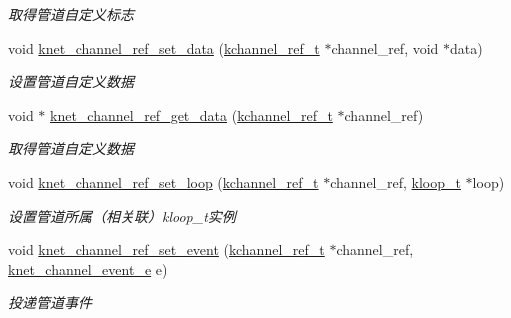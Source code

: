 \begin{DoxyCompactItemize}
\begin{DoxyCompactList}\small\item\em 取得管道自定义标志 \end{DoxyCompactList}\item 
void \hyperlink{a00049_a9c7f39305266c9bf15cd40b8cdf6013e_a9c7f39305266c9bf15cd40b8cdf6013e}{knet\+\_\+channel\+\_\+ref\+\_\+set\+\_\+data} (\hyperlink{a00051_a3b7e82599367eade261456f60ebe2cd9_a3b7e82599367eade261456f60ebe2cd9}{kchannel\+\_\+ref\+\_\+t} $\ast$channel\+\_\+ref, void $\ast$data)
\begin{DoxyCompactList}\small\item\em 设置管道自定义数据 \end{DoxyCompactList}\item 
void $\ast$ \hyperlink{a00049_a16cd64ed0ec7f68931aea3abd3bf1e24_a16cd64ed0ec7f68931aea3abd3bf1e24}{knet\+\_\+channel\+\_\+ref\+\_\+get\+\_\+data} (\hyperlink{a00051_a3b7e82599367eade261456f60ebe2cd9_a3b7e82599367eade261456f60ebe2cd9}{kchannel\+\_\+ref\+\_\+t} $\ast$channel\+\_\+ref)
\begin{DoxyCompactList}\small\item\em 取得管道自定义数据 \end{DoxyCompactList}\item 
void \hyperlink{a00049_a86bb8fd97323daf88aff1b8e9bbfe47c_a86bb8fd97323daf88aff1b8e9bbfe47c}{knet\+\_\+channel\+\_\+ref\+\_\+set\+\_\+loop} (\hyperlink{a00051_a3b7e82599367eade261456f60ebe2cd9_a3b7e82599367eade261456f60ebe2cd9}{kchannel\+\_\+ref\+\_\+t} $\ast$channel\+\_\+ref, \hyperlink{a00051_a97fc76209a58362019f1ded9169e397f_a97fc76209a58362019f1ded9169e397f}{kloop\+\_\+t} $\ast$loop)
\begin{DoxyCompactList}\small\item\em 设置管道所属（相关联）kloop\+\_\+t实例 \end{DoxyCompactList}\item 
void \hyperlink{a00049_a660d3d2503c1c6320394fc382e192849_a660d3d2503c1c6320394fc382e192849}{knet\+\_\+channel\+\_\+ref\+\_\+set\+\_\+event} (\hyperlink{a00051_a3b7e82599367eade261456f60ebe2cd9_a3b7e82599367eade261456f60ebe2cd9}{kchannel\+\_\+ref\+\_\+t} $\ast$channel\+\_\+ref, \hyperlink{a00051_accd62b4c787cfb91e81aa14210302863_accd62b4c787cfb91e81aa14210302863}{knet\+\_\+channel\+\_\+event\+\_\+e} e)
\begin{DoxyCompactList}\small\item\em 投递管道事件 \end{DoxyCompactList}\item 

\end{DoxyCompactItemize}

